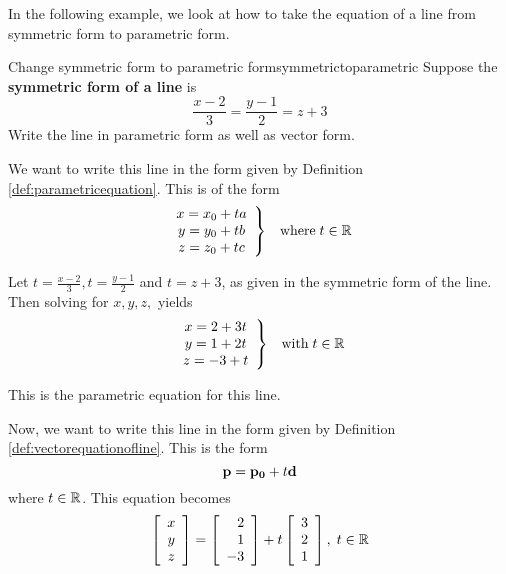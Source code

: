 In the following example, we look at how to take the equation of a line from symmetric form to 
parametric form.

\begin{example}{Change symmetric form to parametric form}{symmetrictoparametric}
Suppose the
\textbf{symmetric form of a line} is
\begin{equation*}
\frac{x-2}{3}=\frac{y-1}{2}=z+3
\end{equation*}
Write the line in parametric form as well as vector form.
\end{example}

\begin{solution}
We want to write this line in the form given by Definition \ref{def:parametricequation}. This is of the form 
\begin{equation*}
\begin{array}{ll}
\left.
\begin{array}{c}
x = x_0 + ta \\
y = y_0 + tb \\
z = z_0 + tc
\end{array}
\right\} & 
\mbox{where} \; t\in \mathbb{R} 
\end{array}
\end{equation*}

Let $t=\frac{x-2}{3},t=\frac{y-1}{2}$ and $t=z+3$, as given in the symmetric form of the line.
 Then solving for $x,y,z,$
yields
\begin{equation*}
\begin{array}{ll}
\left.
\begin{array}{c}
x=2 + 3t \\
y=1 + 2t \\
z=-3 + t 
\end{array}
\right\} & 
\mbox{with} \;t\in \mathbb{R}
\end{array}
\end{equation*}

This is the parametric equation for this line. 

Now, we want to write this line in the form given by Definition \ref{def:vectorequationofline}.
This is the form 
\begin{equation*}
{\bf p}={\bf p_0}+t{\bf d}
\end{equation*}
where $t\in \mathbb{R}$.
This equation becomes
\begin{equation*}
\left[
\begin{array}{c}
x \\
y \\
z
\end{array}
\right] =
\left[
\begin{array}{r}
2 \\
1 \\
-3 
\end{array}
\right]
+
t
\left[
\begin{array}{r}
3 \\
2 \\
1 
\end{array}
\right],
\;t\in
\mathbb{R}
\end{equation*}
\end{solution}
